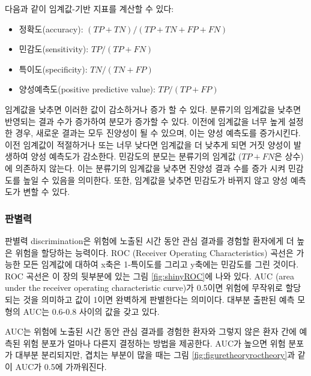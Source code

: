 \documentclass[11pt]{book}
\providecommand{\tightlist}{%
  \setlength{\itemsep}{0pt}\setlength{\parskip}{0pt}}
\theoremstyle{definition}
\theoremstyle{definition}
\theoremstyle{definition}
\theoremstyle{remark}
\begin{document}
다음과 같이 임계값-기반 지표를 계산할 수 있다:

\begin{itemize}
\tightlist
\item
  정확도(accuracy): \((TP+TN)/(TP+TN+FP+FN)\)
\item
  민감도(sensitivity): \(TP/(TP+FN)\)
\item
  특이도(specificity): \(TN/(TN+FP)\)
\item
  양성예측도(positive predictive value): \(TP/(TP+FP)\)
\end{itemize}

임계값을 낮추면 이러한 값이 감소하거나 증가 할 수 있다. 분류기의
임계값을 낮추면 반영되는 결과 수가 증가하여 분모가 증가할 수 있다.
이전에 임계값을 너무 높게 설정한 경우, 새로운 결과는 모두 진양성이 될 수
있으며, 이는 양성 예측도를 증가시킨다. 이전 임계값이 적절하거나 또는
너무 낮다면 임계값을 더 낮추게 되면 거짓 양성이 발생하여 양성 예측도가
감소한다. 민감도의 분모는 분류기의 임계값 (\(TP+FN\)은 상수) 에 의존하지
않는다. 이는 분류기의 임계값을 낮추면 진양성 결과 수를 증가 시켜
민감도를 높일 수 있음을 의미한다. 또한, 임계값을 낮추면 민감도가 바뀌지
않고 양성 예측도가 변할 수 있다.

\subsubsection*{판별력}

판별력 discrimination은 위험에 노출된 시간 동안 관심 결과를 경험할
환자에게 더 높은 위험을 할당하는 능력이다. ROC (Receiver Operating
Characteristics) 곡선은 가능한 모든 임계값에 대하여 x축은 1-특이도를
그리고 y축에는 민감도를 그린 것이다. ROC 곡선은 이 장의 뒷부분에 있는
그림 \ref{fig:shinyROC}에 나와 있다. AUC (area under the receiver
operating characteristic curve)가 0.5이면 위험에 무작위로 할당되는 것을
의미하고 값이 1이면 완벽하게 판별한다는 의미이다. 대부분 출판된 예측
모형의 AUC는 0.6-0.8 사이의 값을 갖고 있다.  

AUC는 위험에 노출된 시간 동안 관심 결과를 경험한 환자와 그렇지 않은 환자
간에 예측된 위험 분포가 얼마나 다른지 결정하는 방법을 제공한다. AUC가
높으면 위험 분포가 대부분 분리되지만, 겹치는 부분이 많을 때는 그림
\ref{fig:figuretheoryroctheory}과 같이 AUC가 0.5에 가까워진다.
\end{document}
